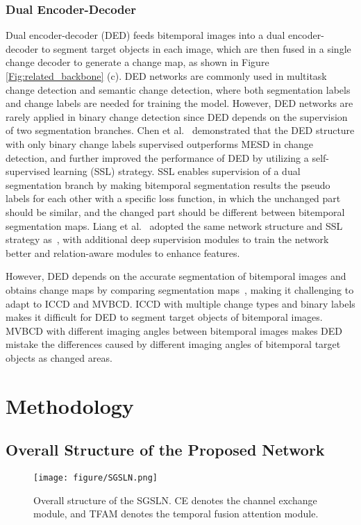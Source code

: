 \documentclass[journal]{IEEEtran}
\begin{document}
\subsubsection{Dual Encoder-Decoder}
Dual encoder-decoder (DED) feeds bitemporal images into a dual encoder-decoder to segment target objects in each image, which are then fused in a single change decoder to generate a change map, as shown in Figure \ref{Fig:related_backbone} (c). DED networks are commonly used in multitask change detection and semantic change detection, where both segmentation labels and change labels are needed for training the model. However, DED networks are rarely applied in binary change detection since DED depends on the supervision of two segmentation branches. Chen et al.~\cite{fccdn} demonstrated that the DED structure with only binary change labels supervised outperforms MESD in change detection, and further improved the performance of DED by utilizing a self-supervised learning (SSL) strategy. SSL enables supervision of a dual segmentation branch by making bitemporal segmentation results the pseudo labels for each other with a specific loss function, in which the unchanged part should be similar, and the changed part should be different between bitemporal segmentation maps.  Liang et al.~\cite{rasr} adopted the same network structure and SSL strategy as~\cite{fccdn}, with additional deep supervision modules to train the network better and relation-aware modules to enhance features.

However, DED depends on the accurate segmentation of bitemporal images and obtains change maps by comparing segmentation maps~\cite{fccdn}, making it challenging to adapt to ICCD and MVBCD. ICCD with multiple change types and binary labels makes it difficult for DED to segment target objects of bitemporal images. MVBCD with different imaging angles between bitemporal images makes DED mistake the differences caused by different imaging angles of bitemporal target objects as changed areas.

\section{Methodology}


\subsection{Overall Structure of the Proposed Network}
\label{section:3.1}

\begin{figure*}[!ht]
	\centering
		\texttt{[image: figure/SGSLN.png]}
	\caption{Overall structure of the SGSLN. CE denotes the channel exchange module, and TFAM denotes the temporal fusion attention module.}
 \label{Fig:SGSLN}
\end{figure*}
\end{document}

